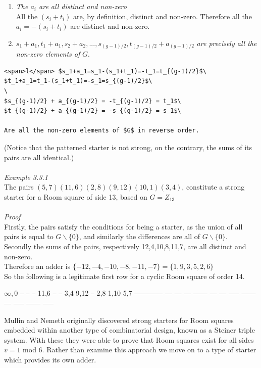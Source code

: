 \documentclass[
  12pt,
  a4paper]{book}
\begin{document}
\begin{enumerate}
\def\labelenumi{(\roman{enumi})}
\item
  \emph{The \(a_i\) are all distinct and non-zero}\\
  All the \((s_i+t_i)\) are, by definition, distinct and non-zero.
  Therefore all the \(a_i=-(s_i+t_i)\) are distinct and non-zero.
\item
  \(s_1 + a_1, t_1 + a_1, s_2 + a_2,..., s_{(g-1)/2}, t_{(g-1)/2}+a_{(g-1)/2}\)
  \emph{are precisely all the non-zero elements of} \(G\).
\end{enumerate}

\begin{verbatim}
<span>l</span> $s_1+a_1=s_1-(s_1+t_1)=-t_1=t_{(g-1)/2}$\
$t_1+a_1=t_1-(s_1+t_1)=-s_1=s_{(g-1)/2}$\
\
$s_{(g-1)/2} + a_{(g-1)/2} = -t_{(g-1)/2} = t_1$\
$t_{(g-1)/2} + a_{(g-1)/2} = -s_{(g-1)/2} = s_1$\

Are all the non-zero elements of $G$ in reverse order.
\end{verbatim}

(Notice that the patterned starter is not strong, on the contrary, the
sums of its pairs are all identical.)\\
~\\
\emph{Example 3.3.1}\\
The pairs \((5,7)(11,6)(2,8)(9,12)(10,1)(3,4)\), constitute a strong
starter for a Room square of side 13, based on \(G=Z_{13}\)\\
~\\
\emph{Proof}\\
Firstly, the pairs satisfy the conditions for being a starter, as the
union of all pairs is equal to \(G \backslash \{0\}\), and similarly the
differences are all of \(G\backslash \{0\}\).\\
Secondly the sums of the pairs, respectively 12,4,10,8,11,7, are all
distinct and non-zero.\\
Therefore an adder is \(\{-12,-4,-10,-8,-11,-7\}=\{1,9,3,5,2,6\}\)\\
So the following is a legitimate first row for a cyclic Room square of
order 14.

\(\infty,0\) -- -- -- 11,6 -- -- 3,4 9,12 -- 2,8 1,10 5,7 ------------
--- --- --- ------ --- --- ----- ------ --- ----- ------ -----

Mullin and Nemeth originally discovered strong starters for Room squares
embedded within another type of combinatorial design, known as a Steiner
triple system. With these they were able to prove that Room squares
exist for all sides \(v=1\) mod 6. Rather than examine this approach we
move on to a type of starter which provides its own adder.
\end{document}
